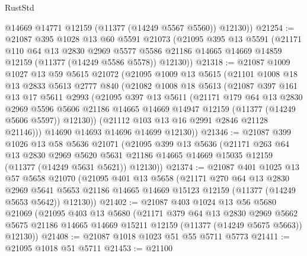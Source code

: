 \begin{lexlean}{RustStd}
\begin{coremodule}
        @14669
        @14771
        @12159
        (@11377 (@14249 @5567 @5560))
        @12130))
@21254 := @21087
    @395
    @1028
    @13
    @60
    @5591
    @21073
    (@21095
      @395
      @13
      @5591
      (@21171
        @110
        @64
        @13
        @2830
        @2969
        @5577
        @5586
        @21186
        @14665
        @14669
        @14859
        @12159
        (@11377 (@14249 @5586 @5578))
        @12130))
@21318 := @21087
    @1009
    @1027
    @13
    @59
    @5615
    @21072
    (@21095
      @1009
      @13
      @5615
      (@21101
        @1008
        @18
        @13
        @2833
        @5613
        @2777
        @840
        (@21082
          @1008
          @18
          @5613
          (@21087
            @397
            @161
            @13
            @17
            @5611
            @2993
            (@21095
              @397
              @13
              @5611
              (@21171
                @179
                @64
                @13
                @2830
                @2969
                @5596
                @5606
                @21186
                @14665
                @14669
                @14947
                @12159
                (@11377 (@14249 @5606 @5597))
                @12130))
            (@21112 @103 @13 @16 @2991 @2846 @21128 @21146)))
        @14690
        @14693
        @14696
        @14699
        @12130))
@21346 := @21087
    @399
    @1026
    @13
    @58
    @5636
    @21071
    (@21095
      @399
      @13
      @5636
      (@21171
        @263
        @64
        @13
        @2830
        @2969
        @5620
        @5631
        @21186
        @14665
        @14669
        @15035
        @12159
        (@11377 (@14249 @5631 @5621))
        @12130))
@21374 := @21087
    @401
    @1025
    @13
    @57
    @5658
    @21070
    (@21095
      @401
      @13
      @5658
      (@21171
        @270
        @64
        @13
        @2830
        @2969
        @5641
        @5653
        @21186
        @14665
        @14669
        @15123
        @12159
        (@11377 (@14249 @5653 @5642))
        @12130))
@21402 := @21087
    @403
    @1024
    @13
    @56
    @5680
    @21069
    (@21095
      @403
      @13
      @5680
      (@21171
        @379
        @64
        @13
        @2830
        @2969
        @5662
        @5675
        @21186
        @14665
        @14669
        @15211
        @12159
        (@11377 (@14249 @5675 @5663))
        @12130))
@21408 := @21087 @1018 @1023 @51 @55 @5711 @5773
@21411 := @21095 @1018 @51 @5711
@21453 := @21100

\end{coremodule}
\end{lexlean}
